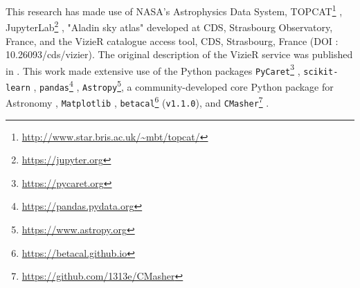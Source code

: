 \documentclass{aa}
\begin{document}
\begin{acknowledgements}
This research has made use of NASA’s Astrophysics Data System, TOPCAT\footnote{\url{http://www.star.bris.ac.uk/~mbt/topcat/}} \citep{2005ASPC..347...29T}, JupyterLab\footnote{\url{https://jupyter.org}} \citep{jupyter}, "Aladin sky atlas" \citep[\texttt{v11.0.24};][]{2000A&AS..143...33B} developed at CDS, Strasbourg Observatory, France, and the VizieR catalogue access tool, CDS, Strasbourg, France (DOI : 10.26093/cds/vizier). The original description of the VizieR service was published in \cite{vizier}.
This work made extensive use of the Python packages \texttt{PyCaret}\footnote{\url{https://pycaret.org}} \citep[\texttt{v2.3.10};][]{PyCaret}, \texttt{scikit-learn} \citep[\texttt{v0.23.2};][]{scikit-learn}, \texttt{pandas}\footnote{\url{https://pandas.pydata.org}} \citep[\texttt{v1.4.2};][]{pandas}, \texttt{Astropy}\footnote{\url{https://www.astropy.org}}, a community-developed core Python package for Astronomy \citep[\texttt{v5.0};][]{astropy:2013, astropy:2018, 2022ApJ...935..167A}, \texttt{Matplotlib} \citep[\texttt{v3.5.1};][]{Hunter:2007}, \texttt{betacal}\footnote{\url{https://betacal.github.io}} (\texttt{v1.1.0}), and \texttt{CMasher}\footnote{\url{https://github.com/1313e/CMasher}} \citep[\texttt{v1.6.3};][]{2020JOSS....5.2004V}.
\end{acknowledgements}

%
%


\end{document}
